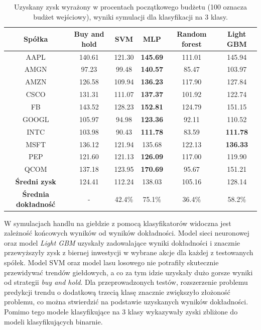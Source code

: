 \documentclass[a4paper, twoside, 11pt, openright]{article}
\begin{document}
 \begin{table}[H]
    \centering
    \begin{tabular}{|c|c|c|c|c|c|}
    \hline
        \textbf{Spółka}  & \textbf{Buy and hold} & \textbf{SVM} &  \textbf{MLP}  &  \textbf{Random forest}  &  \textbf{Light GBM} \\ \hline
AAPL & 140.61 & 121.30  & \textbf{145.69}  & 111.01 & 145.94 \\ \hline
AMGN & 97.23 & 99.48  & \textbf{140.57} & 85.47 &  103.97 \\ \hline
AMZN & 126.58 &  109.94 & \textbf{136.23} & 117.90 & 127.84 \\ \hline
CSCO & 131.31 & 111.07  & \textbf{137.37}  & 101.92 & 122.74  \\ \hline
FB   & 143.52 &  128.23 & \textbf{152.81} & 124.79 & 151.15 \\ \hline
GOOGL & 105.97 &  94.98 &  \textbf{123.36} & 92.11 & 110.52 \\ \hline
INTC & 103.98 & 90.43  & \textbf{111.78}  & 83.59 & \textbf{111.78} \\ \hline
MSFT &  136.12 & 121.94  &  135.68  & 122.13 & \textbf{136.33} \\ \hline
PEP  & 121.60 &  121.13 & \textbf{126.09} & 117.00 & 119.90 \\ \hline
QCOM & 137.18 &  123.95 &  \textbf{170.69} & 95.67 & 151.21 \\ \hline \hline
\textbf{Średni zysk} & 124.41 & 112.24 & 138.03 & 105.16 & 128.14 \\  \hline  
\textbf{Średnia dokładność} &  - & 42.4\% & 75.1\% &  36.4\% & 58.2\% \\  \hline  
    \end{tabular}
    \caption{Uzyskany zysk wyrażony w procentach początkowego budżetu (100 oznacza budżet wejściowy), wyniki symulacji dla klasyfikacji na 3 klasy.}
    \label{tab:comparison_simulation_discrete}
\end{table}   

W symulacjach handlu na giełdzie z pomocą klasyfikatorów widoczna jest zależność końcowych wyników od wyników dokładności. Model sieci neuronowej oraz model \textit{Light GBM} uzyskały zadowalające wyniki dokładności i znacznie przewyższyły zysk z biernej inwestycji w wybrane akcje dla każdej z testowanych spółek. Model SVM oraz model lasu losowego nie potrafiły skutecznie przewidywać trendów giełdowych, a co za tym idzie uzyskały dużo gorsze wyniki od strategii \textit{buy and hold}. Dla przeprowadzonych testów, rozszerzenie problemu predykcji trendu o dodatkową trzecią klasę znacznie zwiększyło złożoność problemu, co można stwierdzić na podstawie uzyskanych wyników dokładności. Pomimo tego modele klasyfikujące na 3 klasy wykazywały zyski zbliżone do modeli klasyfikujących binarnie.
\end{document}
